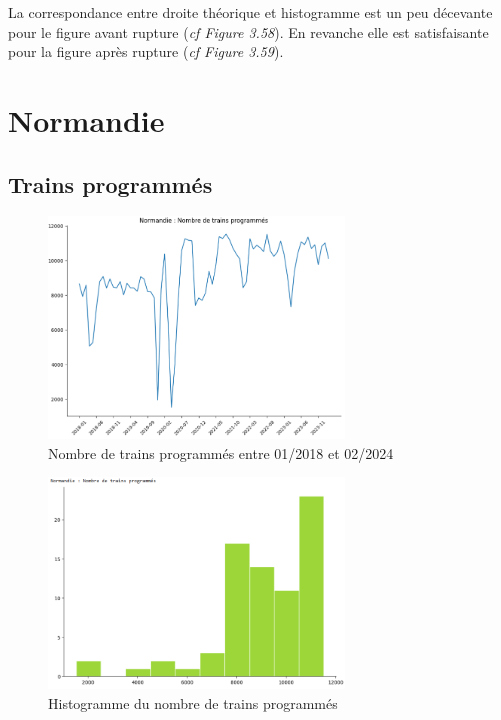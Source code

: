{La correspondance entre droite théorique et histogramme est un peu décevante pour le figure avant rupture (\textit{cf Figure 3.58}). En revanche elle est satisfaisante pour la figure après rupture (\textit{cf Figure 3.59}).


\section{Normandie}

\subsection{Trains programmés}

\begin{figure}[H]
  \centering
  \includegraphics[width=0.7\textwidth]{Nor_TP_1.png}
  \caption{Nombre de trains programmés entre 01/2018 et 02/2024}
\end{figure}

\begin{figure}[H]
  \centering
  \includegraphics[width=0.7\textwidth]{Nor_TP_2.png}
  \caption{Histogramme du nombre de trains programmés}
\end{figure}

}
